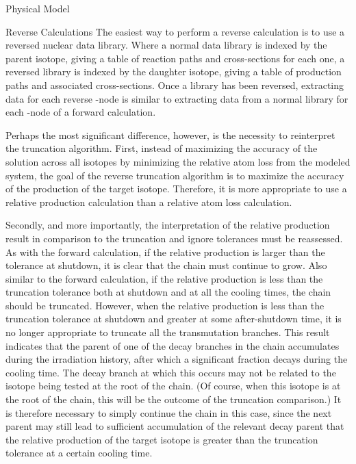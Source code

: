 \begin{chapter}{Physical Model\label{chap:physical}}
\begin{section}{Reverse Calculations}
  The easiest way to perform a reverse calculation is to use a
  reversed nuclear data library.  Where a normal data library is
  indexed by the parent isotope, giving a table of reaction paths and
  cross-sections for each one, a reversed library is indexed by the
  daughter isotope, giving a table of production paths and associated
  cross-sections.  Once a library has been reversed, extracting data
  for each reverse \pc-node is similar to extracting data from a
  normal library for each \pc-node of a forward calculation.
  
  Perhaps the most significant difference, however, is the necessity
  to reinterpret the truncation algorithm.  First, instead of
  maximizing the accuracy of the solution across all isotopes by
  minimizing the relative atom loss from the modeled system, the goal
  of the reverse truncation algorithm is to maximize the accuracy of
  the production of the target isotope.  Therefore, it is more
  appropriate to use a relative production calculation than a relative
  atom loss calculation.  
  
  Secondly, and more importantly, the interpretation of the relative
  production result in comparison to the truncation and ignore
  tolerances must be reassessed.  As with the forward calculation, if
  the relative production is larger than the tolerance at shutdown, it
  is clear that the chain must continue to grow.  Also similar to the
  forward calculation, if the relative production is less than the
  truncation tolerance both at shutdown and at all the cooling times,
  the chain should be truncated.  However, when the relative
  production is less than the truncation tolerance at shutdown and
  greater at some after-shutdown time, it is no longer appropriate to
  truncate all the transmutation branches.  This result indicates that
  the parent of one of the decay branches in the chain accumulates
  during the irradiation history, after which a significant fraction
  decays during the cooling time.  The decay branch at which this
  occurs may not be related to the isotope being tested at the root of
  the chain.  (Of course, when this isotope is at the root of the
  chain, this will be the outcome of the truncation comparison.)  It
  is therefore necessary to simply continue the chain in this case,
  since the next parent may still lead to sufficient accumulation of
  the relevant decay parent that the relative production of the target
  isotope is greater than the truncation tolerance at a certain
  cooling time.
  

\end{section}
\end{chapter}
